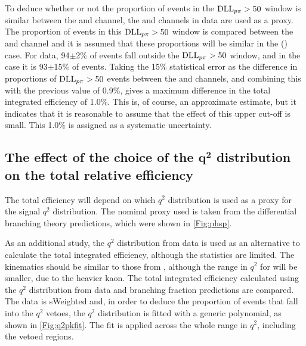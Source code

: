 To deduce whether or not the proportion of events in the $\mathrm{DLL}_{{p}{\pi}}>50$ window is similar between the \Lbpijpsi and \Lbpi channel, the \LbK and \LbKjpsi channels in data are used as a proxy. The proportion of events in this $\mathrm{DLL}_{{p}{\pi}}>50$ window is compared between the \LbK and \LbKjpsi channel and it is assumed that these proportions will be similar in the \Lbpijpsi (\Lbpi) case. For \LbKjpsi data,  94$\pm$2\% of events fall outside the $\mathrm{DLL}_{{p}{\pi}}>50$ window, and in the \LbK case it is 93$\pm$15\% of events. Taking the 15\% statistical error as the difference in proportions of $\mathrm{DLL}_{{p}{\pi}}>50$ events between the \LbK and \LbKjpsi channels, and combining this with the previous value of 0.9\%, gives a maximum difference in the total integrated efficiency of 1.0\%. This is, of course, an approximate estimate, but it indicates that it is reasonable to assume that the effect of this upper cut-off is small. This 1.0\% is assigned as a systematic uncertainty.




\subsection[The effect of the choice of the $q^{2}$ distribution on the total relative efficiency]{The effect of the choice of the $\mathbold{q^{2}}$ distribution on the total relative efficiency}
\label{subsec:bdtq2}
The total efficiency will depend on which $q^{2}$ distribution is used as a proxy for the signal $q^{2}$ distribution. The nominal proxy used is taken from the \LbL differential branching theory predictions, which were shown in \autoref{Fig:phsp}.

As an additional study, the $q^{2}$ distribution from \LbK data is used as an alternative to calculate the total integrated efficiency, although the statistics are limited. The \LbK kinematics should be similar to those from \Lbpi, although the range in $q^{2}$ for \LbK will be smaller, due to the heavier kaon. The total integrated efficiency calculated using the $q^{2}$ distribution from \LbK data and \LbL branching fraction predictions are compared. The \LbK data is sWeighted and, in order to deduce the proportion of \LbK events that fall into the $q^{2}$ vetoes, the $q^{2}$ distribution is fitted with a generic polynomial, as shown in \autoref{Fig:q2pkfit}. The fit is applied across the whole range in $q^{2}$, including the vetoed regions. %


